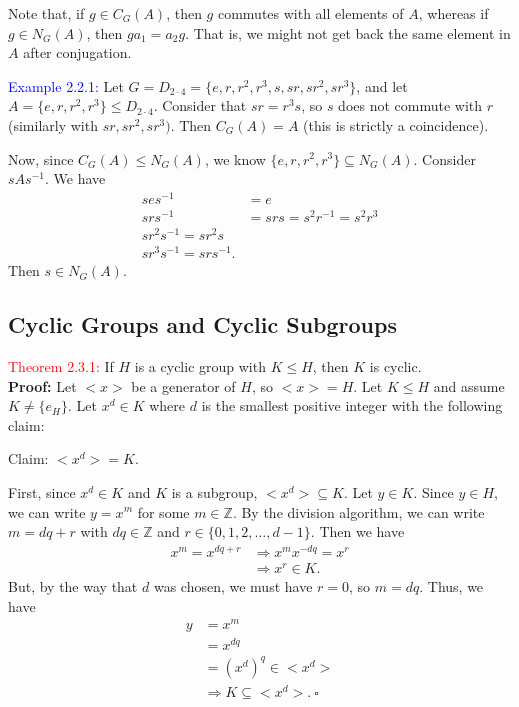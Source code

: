 \documentclass{article}
\begin{document}
Note that, if $g \in C_G(A)$, then $g$ commutes with all elements of $A$, whereas if $g \in N_G(A)$, then $ga_1 = a_2g$. That is, we might 
not get back the same element in $A$ after conjugation.

\textcolor{blue}{Example 2.2.1:} Let $G = D_{2 \cdot 4} = \{e,r,r^2, r^3, s,sr,sr^2, sr^3\}$, and let $A = \{e,r,r^2,r^3\} \leq D_{2 \cdot 4}$. 
Consider that $sr = r^3s$, so $s$ does not commute with $r$ (similarly with $sr, sr^2, sr^3)$. Then $C_G(A) = A$ (this is strictly a 
coincidence). 

Now, since $C_G(A) \leq N_G(A)$, we know $\{e,r,r^2, r^3\} \subseteq N_G(A)$. Consider $sAs^{-1}$. We have
\begin{align*}
    ses^{-1} &= e \\
    srs^{-1} &= srs = s^2r^{-1} = s^2r^3 \\
    sr^2s^{-1} = sr^2s \\
    sr^3s^{-1} = srs^{-1}.
\end{align*}
Then $s \in N_G(A)$.

\subsection{Cyclic Groups and Cyclic Subgroups}
\textcolor{red}{Theorem 2.3.1:} If $H$ is a cyclic group with $K \leq H$, then $K$ is cyclic.\\
\textbf{Proof:} Let $<x>$ be a generator of $H$, so $<x> = H$. Let $K \leq H$ and assume $K \neq \{e_H\}$. Let $x^d \in K$ where $d$ is 
the smallest positive integer with the following claim:

Claim: $<x^d> = K$.

First, since $x^d \in K$ and $K$ is a subgroup, $<x^d> \subseteq K$. Let $y \in K$. Since $y \in H$, we can write $y=x^m$ for some 
$m \in \mathbb{Z}$. By the division algorithm, we can write $m = dq+r$ with $dq \in \mathbb{Z}$ and $r \in \{0,1,2, \dots, d-1\}$. Then 
we have
\begin{align*}
    x^m = x^{dq+r} &\Longrightarrow x^mx^{-dq}=x^r \\
    &\Longrightarrow x^r \in K.
\end{align*}
But, by the way that $d$ was chosen, we must have $r=0$, so $m=dq$. Thus, we have
\begin{align*}
    y&=x^m \\
    &= x^{dq} \\
    &= (x^d)^q \in <x^d> \\
    &\Longrightarrow K \subseteq <x^d>. \ \square
\end{align*}
\end{document}
